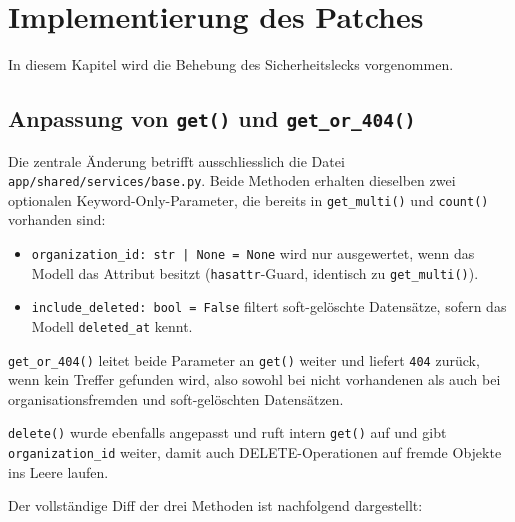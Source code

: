 \section{Implementierung des Patches}
\label{sec:implementierung}

In diesem Kapitel wird die Behebung des Sicherheitslecks vorgenommen.

\subsection{Anpassung von \texttt{get()} und \texttt{get\_or\_404()}}
\label{sec:patch-base}

Die zentrale Änderung betrifft ausschliesslich die Datei
\texttt{app/shared/services/base.py}.
Beide Methoden erhalten dieselben zwei optionalen Keyword-Only-Parameter, die
bereits in \texttt{get\_multi()} und \texttt{count()} vorhanden sind:

\begin{itemize}
    \item \texttt{organization\_id: str | None = None} \textendash{} wird
          nur ausgewertet, wenn das Modell das Attribut besitzt
          (\texttt{hasattr}-Guard, identisch zu \texttt{get\_multi()}).
    \item \texttt{include\_deleted: bool = False} \textendash{} filtert
          soft-gelöschte Datensätze, sofern das Modell \texttt{deleted\_at}
          kennt.
\end{itemize}

\texttt{get\_or\_404()} leitet beide Parameter an \texttt{get()} weiter und
liefert \texttt{404} zurück, wenn kein Treffer gefunden wird, also sowohl bei
nicht vorhandenen als auch bei organisationsfremden und soft-gelöschten
Datensätzen.

\texttt{delete()} wurde ebenfalls angepasst und ruft intern \texttt{get()} auf
und gibt \texttt{organization\_id} weiter, damit auch DELETE-Operationen auf
fremde Objekte ins Leere laufen.

Der vollständige Diff der drei Methoden ist nachfolgend dargestellt:


